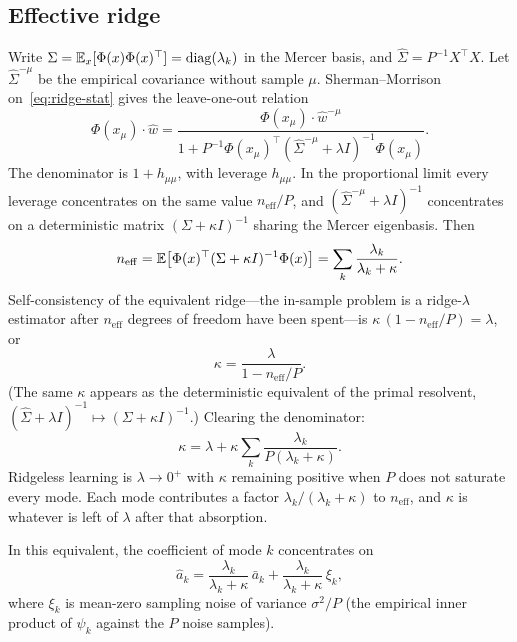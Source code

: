 \subsection{Effective ridge}

Write $\Sigma=\mathbb{E}_x[\Phi(x)\Phi(x)^\top]=\mathrm{diag}(\lambda_k)$ in the Mercer basis, and $\hat\Sigma=P^{-1}X^\top X$. Let $\hat\Sigma^{-\mu}$ be the empirical covariance without sample $\mu$. Sherman--Morrison on~\eqref{eq:ridge-stat} gives the leave-one-out relation
\begin{equation}
  \Phi(x_\mu)\cdot\hat w
  =\frac{\Phi(x_\mu)\cdot\hat w^{-\mu}}{1+P^{-1}\Phi(x_\mu)^\top(\hat\Sigma^{-\mu}+\lambda I)^{-1}\Phi(x_\mu)}.
  \label{eq:loo}
\end{equation}
The denominator is $1+h_{\mu\mu}$, with leverage $h_{\mu\mu}$. In the proportional limit every leverage concentrates on the same value $n_{\mathrm{eff}}/P$, and $(\hat\Sigma^{-\mu}+\lambda I)^{-1}$ concentrates on a deterministic matrix $(\Sigma+\kappa I)^{-1}$ sharing the Mercer eigenbasis. Then
\begin{equation}
  n_{\mathrm{eff}}
  =\mathbb{E}\bigl[\Phi(x)^\top(\Sigma+\kappa I)^{-1}\Phi(x)\bigr]
  =\sum_k\frac{\lambda_k}{\lambda_k+\kappa}.
  \label{eq:df}
\end{equation}
Self-consistency of the equivalent ridge---the in-sample problem is a ridge-$\lambda$ estimator after $n_{\mathrm{eff}}$ degrees of freedom have been spent---is $\kappa\,(1-n_{\mathrm{eff}}/P)=\lambda$, or
\begin{equation}
  \kappa=\frac{\lambda}{1-n_{\mathrm{eff}}/P}.
  \label{eq:kappa-dof}
\end{equation}
(The same $\kappa$ appears as the deterministic equivalent of the primal resolvent, $(\hat\Sigma+\lambda I)^{-1}\mapsto(\Sigma+\kappa I)^{-1}$.) Clearing the denominator:
\begin{equation}
  \kappa=\lambda+\kappa\sum_{k}\frac{\lambda_k}{P(\lambda_k+\kappa)}.
  \label{eq:kappa}
\end{equation}
Ridgeless learning is $\lambda\to 0^+$ with $\kappa$ remaining positive when $P$ does not saturate every mode. Each mode contributes a factor $\lambda_k/(\lambda_k+\kappa)$ to $n_{\mathrm{eff}}$, and $\kappa$ is whatever is left of $\lambda$ after that absorption.

In this equivalent, the coefficient of mode $k$ concentrates on
\begin{equation}
  \hat a_k
  =\frac{\lambda_k}{\lambda_k+\kappa}\,\bar a_k
  +\frac{\lambda_k}{\lambda_k+\kappa}\,\xi_k,
  \label{eq:mode-shrink}
\end{equation}
where $\xi_k$ is mean-zero sampling noise of variance $\sigma^2/P$ (the empirical inner product of $\psi_k$ against the $P$ noise samples).

